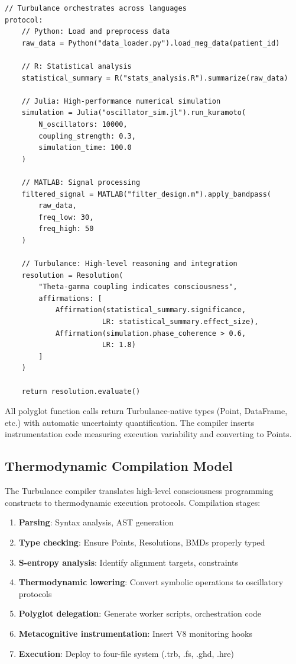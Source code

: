 \begin{verbatim}
// Turbulance orchestrates across languages
protocol:
    // Python: Load and preprocess data
    raw_data = Python("data_loader.py").load_meg_data(patient_id)

    // R: Statistical analysis
    statistical_summary = R("stats_analysis.R").summarize(raw_data)

    // Julia: High-performance numerical simulation
    simulation = Julia("oscillator_sim.jl").run_kuramoto(
        N_oscillators: 10000,
        coupling_strength: 0.3,
        simulation_time: 100.0
    )

    // MATLAB: Signal processing
    filtered_signal = MATLAB("filter_design.m").apply_bandpass(
        raw_data,
        freq_low: 30,
        freq_high: 50
    )

    // Turbulance: High-level reasoning and integration
    resolution = Resolution(
        "Theta-gamma coupling indicates consciousness",
        affirmations: [
            Affirmation(statistical_summary.significance,
                       LR: statistical_summary.effect_size),
            Affirmation(simulation.phase_coherence > 0.6,
                       LR: 1.8)
        ]
    )

    return resolution.evaluate()
\end{verbatim}

\begin{proposition}
All polyglot function calls return Turbulance-native types (Point, DataFrame, etc.) with automatic uncertainty quantification. The compiler inserts instrumentation code measuring execution variability and converting to Points.
\end{proposition}

\subsection{Thermodynamic Compilation Model}

\begin{definition}
The Turbulance compiler translates high-level consciousness programming constructs to thermodynamic execution protocols. Compilation stages:

\begin{enumerate}
\item \textbf{Parsing}: Syntax analysis, AST generation
\item \textbf{Type checking}: Ensure Points, Resolutions, BMDs properly typed
\item \textbf{S-entropy analysis}: Identify alignment targets, constraints
\item \textbf{Thermodynamic lowering}: Convert symbolic operations to oscillatory protocols
\item \textbf{Polyglot delegation}: Generate worker scripts, orchestration code
\item \textbf{Metacognitive instrumentation}: Insert V8 monitoring hooks
\item \textbf{Execution}: Deploy to four-file system (.trb, .fs, .ghd, .hre)
\end{enumerate}
\end{definition}

